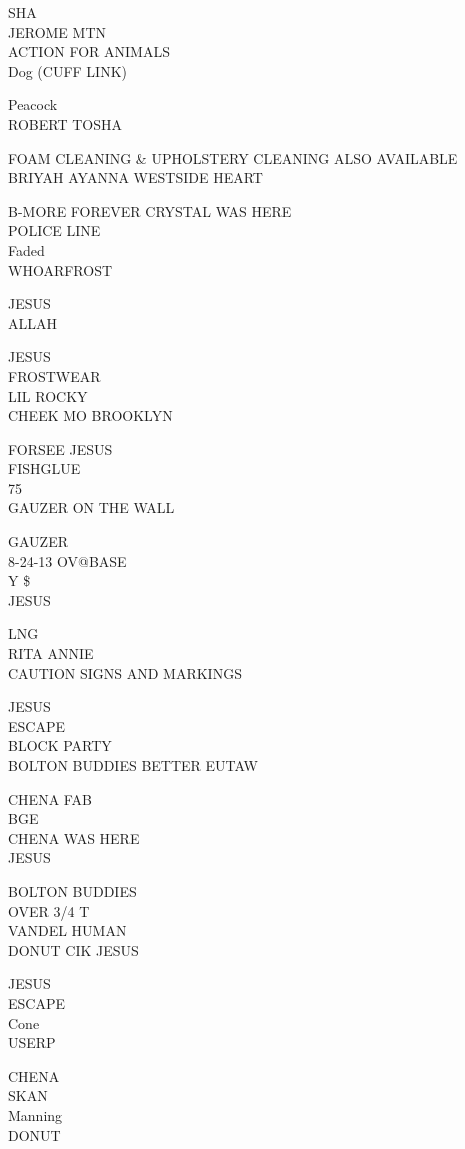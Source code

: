 \documentclass[10pt,letterpaper]{article}
\begin{document}
SHA\\
JEROME MTN\\
ACTION FOR ANIMALS\\
Dog (CUFF LINK)

Peacock\\
ROBERT TOSHA

FOAM CLEANING \& UPHOLSTERY CLEANING ALSO AVAILABLE\\
BRIYAH AYANNA WESTSIDE HEART

B{-}MORE FOREVER CRYSTAL WAS HERE\\
POLICE LINE\\
Faded\\
WHOARFROST

JESUS\\
ALLAH

JESUS\\
FROSTWEAR\\
LIL ROCKY\\
CHEEK MO BROOKLYN

FORSEE JESUS\\
FISHGLUE\\
75\\
GAUZER ON THE WALL

GAUZER\\
8{-}24{-}13 OV@BASE\\
Y \$\\
JESUS

LNG\\
RITA ANNIE\\
CAUTION SIGNS AND MARKINGS

JESUS\\
ESCAPE\\
BLOCK PARTY\\
BOLTON BUDDIES BETTER EUTAW

CHENA FAB\\
BGE\\
CHENA WAS HERE\\
JESUS

BOLTON BUDDIES\\
OVER 3/4 T\\
VANDEL HUMAN\\
DONUT CIK JESUS

JESUS\\
ESCAPE\\
Cone\\
USERP

CHENA\\
SKAN\\
Manning\\
DONUT
\end{document}
